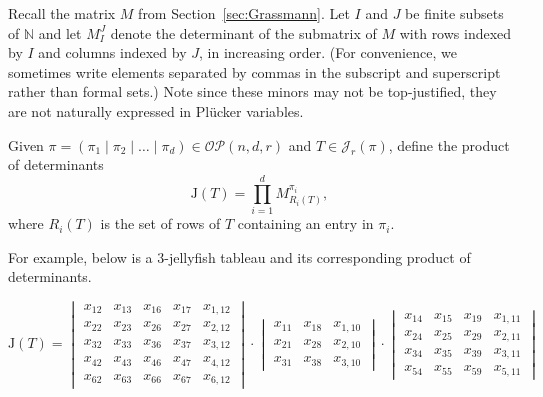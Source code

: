 \documentclass[ALCO, Unicode]{cedram}
\numberwithin{equation}{section}
\newcommand{\rstab}{\mathcal{J}}
\newcommand{\rspoly}{\mathrm{J}}
\newcommand{\ordsetpart}{\mathcal{OP}}
\begin{document}
Recall the matrix $M$ from Section~\ref{sec:Grassmann}. Let $I$ and $J$ be finite subsets of $\mathbb{N}$ and let $M_I^J$ denote the determinant of the submatrix of $M$ with rows indexed by $I$ and columns indexed by $J$, in increasing order. (For convenience, we sometimes write elements separated by commas in the subscript and superscript rather than formal sets.) Note since these minors may not be top-justified, they are not naturally expressed in Pl\"ucker variables.

\begin{definition}
\label{def:rsdet}
Given $\pi=(\pi_1\mid \pi_2\mid\ldots\mid \pi_d)\in\ordsetpart(n,d,r)$ and $T\in \rstab_r(\pi)$, define the product of determinants \[\rspoly(T)= 
\displaystyle\prod_{i=1}^d M_{R_i(T)}^{\pi_i},\] where $R_i(T)$ is the set of rows of $T$ containing an entry in $\pi_i$.
\end{definition}

\begin{example}\label{ex:3-jellyfish}
For example, below is a $3$-jellyfish tableau and its corresponding product of determinants. 
\begin{center}
\hspace{.5in}
$\rspoly(T)=\begin{vmatrix}
x_{12} & x_{13} & x_{16} & x_{17} & x_{1,12}\\
x_{22} & x_{23} & x_{26} & x_{27} & x_{2,12}\\
x_{32} & x_{33} & x_{36} & x_{37} & x_{3,12}\\
x_{42} & x_{43} & x_{46} & x_{47} & x_{4,12}\\
x_{62} & x_{63} & x_{66} & x_{67} & x_{6,12}
\end{vmatrix}\cdot
\begin{vmatrix}
x_{11} & x_{18} & x_{1,10}\\
x_{21} & x_{28} & x_{2,10}\\
x_{31} & x_{38} & x_{3,10} 
\end{vmatrix}\cdot
\begin{vmatrix}
x_{14} & x_{15} & x_{19} & x_{1,11} \\
x_{24} & x_{25} & x_{29} & x_{2,11} \\
x_{34} & x_{35} & x_{39} & x_{3,11} \\
x_{54} & x_{55} & x_{59} & x_{5,11} 

\end{vmatrix}
$

\end{center}
\end{example}
\end{document}
